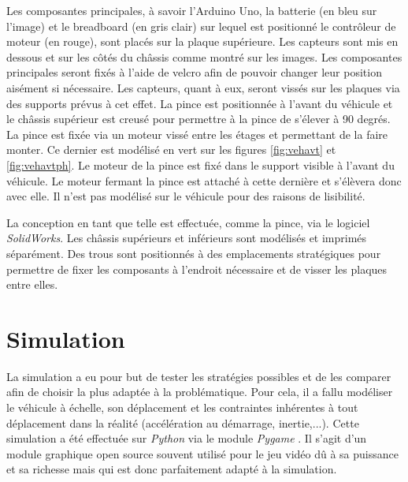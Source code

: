 \documentclass[a4paper,11pt]{article}
\begin{document}
Les composantes principales, à savoir l'Arduino Uno, la batterie (en bleu sur l'image) et le breadboard (en gris clair) sur lequel est positionné le contrôleur de moteur (en rouge), sont placés sur la plaque supérieure. Les capteurs sont mis en dessous et sur les côtés du châssis comme montré sur les images. Les composantes principales seront fixés à l'aide de velcro afin de pouvoir changer leur position aisément si nécessaire. Les capteurs, quant à eux, seront vissés sur les plaques via des supports prévus à cet effet. La pince est positionnée à l'avant du véhicule et le châssis supérieur est creusé pour permettre à la pince de s'élever à 90 degrés. La pince est fixée via un moteur vissé entre les étages et permettant de la faire monter. Ce dernier est modélisé en vert sur les figures \ref{fig:vehavt} et \ref{fig:vehavtph}. Le moteur de la pince est fixé dans le support visible à l'avant du véhicule. Le moteur fermant la pince est attaché à cette dernière et s'élèvera donc avec elle. Il n'est pas modélisé sur le véhicule pour des raisons de lisibilité.

La conception en tant que telle est effectuée, comme la pince, via le logiciel \textit{SolidWorks}. Les châssis supérieurs et inférieurs sont modélisés et imprimés séparément. Des trous sont positionnés à des emplacements stratégiques pour permettre de fixer les composants à l'endroit nécessaire et de visser les plaques entre elles.



\section{Simulation}

La simulation a eu pour but de tester les stratégies possibles et de les comparer afin de choisir la plus adaptée à la problématique. Pour cela, il a fallu modéliser le véhicule à échelle, son déplacement et les contraintes inhérentes à tout déplacement dans la réalité (accélération au démarrage, inertie,...). Cette simulation a été effectuée sur \textit{Python} via le module \textit{Pygame} \cite{pyginf}. Il s'agit d'un module graphique open source souvent utilisé pour le jeu vidéo \cite{pygjeu}  dû à sa puissance et sa richesse mais qui est donc parfaitement adapté à la simulation.
\newline
\end{document}
